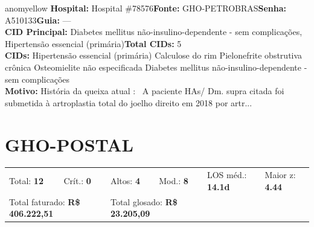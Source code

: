 \documentclass[a4paper,10pt]{article}
\begin{document}
\begin{anomalycard}[Interna\c{c}\~{a}o \#166117 | Pac. \#61273 | MODERADO (z=2.07) | LOS: 12d | 22/02/2026\,$\to$\,06/03/2026]{anomyellow}
\textbf{Hospital:} Hospital \#78576\quad \textbf{Fonte:} GHO-PETROBRAS\quad \textbf{Senha:} A510133\quad \textbf{Guia:} ---\\

\textbf{CID Principal:} {\small Diabetes mellitus não-insulino-dependente - sem complicações, Hipertensão essencial (primária)}\quad\textbf{Total CIDs:} 5\\

\textbf{CIDs:} {\scriptsize Hipertensão essencial (primária) \textbar{} Calculose do rim \textbar{} Pielonefrite obstrutiva crônica \textbar{} Osteomielite não especificada \textbar{} Diabetes mellitus não-insulino-dependente - sem complicações}\\

\textbf{Motivo:} {\scriptsize História da queixa atual :  A paciente HAs/ Dm. supra citada foi submetida à artroplastia total do joelho direito em 2018 por artr...}\\



\end{anomalycard}


\clearpage
\section{GHO-POSTAL}
\begin{tcolorbox}[colback=lightblue,colframe=jcubeblue,title={\textbf{Resumo --- GHO-POSTAL}}]
\begin{tabular}{ll@{\quad}ll@{\quad}ll}
Total: \textbf{12} &
Cr\'{i}t.: \textcolor{anomred}{\textbf{0}} &
Altos: \textcolor{anomorange}{\textbf{4}} &
Mod.: \textcolor{anomyellow}{\textbf{8}} &
LOS m\'{e}d.: \textbf{14.1d} &
Maior z: \textbf{4.44} \\

\multicolumn{2}{l}{Total faturado: \textbf{R\$ 406.222,51}} & 
\multicolumn{2}{l}{\textcolor{anomred}{Total glosado: \textbf{R\$ 23.205,09}}} & & \\

\end{tabular}
\end{tcolorbox}
\end{document}
